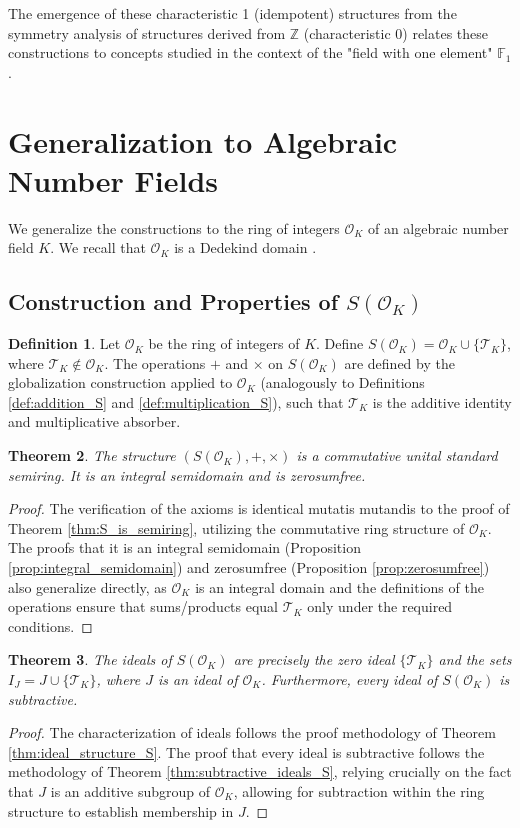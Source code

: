 \documentclass[11pt, a4paper]{article}
\theoremstyle{plain}
\newtheorem{theorem}{Theorem}[section]
\theoremstyle{definition}
\newtheorem{definition}[theorem]{Definition}
\numberwithin{equation}{section}
\newcommand{\Z}{\mathbb{Z}}
\newcommand{\F}{\mathbb{F}}
\newcommand{\Tobj}{\mathcal{T}} %
\newcommand{\OK}{\mathcal{O}_K}
\newcommand{\SOK}{S(\OK)}
\begin{document}
The emergence of these characteristic 1 (idempotent) structures from the symmetry analysis of structures derived from $\Z$ (characteristic 0) relates these constructions to concepts studied in the context of the "field with one element" $\F_1$ \cite{ConnesQuanta, CartierFrontiersII}.

\section{Generalization to Algebraic Number Fields}

We generalize the constructions to the ring of integers $\OK$ of an algebraic number field $K$. We recall that $\OK$ is a Dedekind domain \cite{MilneANT}.

\subsection{Construction and Properties of $\SOK$}

\begin{definition}
Let $\OK$ be the ring of integers of $K$. Define $\SOK = \OK \cup \{\Tobj_K\}$, where $\Tobj_K \notin \OK$. The operations $+$ and $\times$ on $\SOK$ are defined by the globalization construction applied to $\OK$ (analogously to Definitions \ref{def:addition_S} and \ref{def:multiplication_S}), such that $\Tobj_K$ is the additive identity and multiplicative absorber.
\end{definition}

\begin{theorem}
The structure $(\SOK, +, \times)$ is a commutative unital standard semiring. It is an integral semidomain and is zerosumfree.
\end{theorem}
\begin{proof}
The verification of the axioms is identical mutatis mutandis to the proof of Theorem \ref{thm:S_is_semiring}, utilizing the commutative ring structure of $\OK$. The proofs that it is an integral semidomain (Proposition \ref{prop:integral_semidomain}) and zerosumfree (Proposition \ref{prop:zerosumfree}) also generalize directly, as $\OK$ is an integral domain and the definitions of the operations ensure that sums/products equal $\Tobj_K$ only under the required conditions.
\end{proof}

\begin{theorem}\label{thm:ideal_structure_SOK}
The ideals of $\SOK$ are precisely the zero ideal $\{\Tobj_K\}$ and the sets $I_J = J \cup \{\Tobj_K\}$, where $J$ is an ideal of $\OK$. Furthermore, every ideal of $\SOK$ is subtractive.
\end{theorem}
\begin{proof}
The characterization of ideals follows the proof methodology of Theorem \ref{thm:ideal_structure_S}. The proof that every ideal is subtractive follows the methodology of Theorem \ref{thm:subtractive_ideals_S}, relying crucially on the fact that $J$ is an additive subgroup of $\OK$, allowing for subtraction within the ring structure to establish membership in $J$.
\end{proof}
\end{document}
